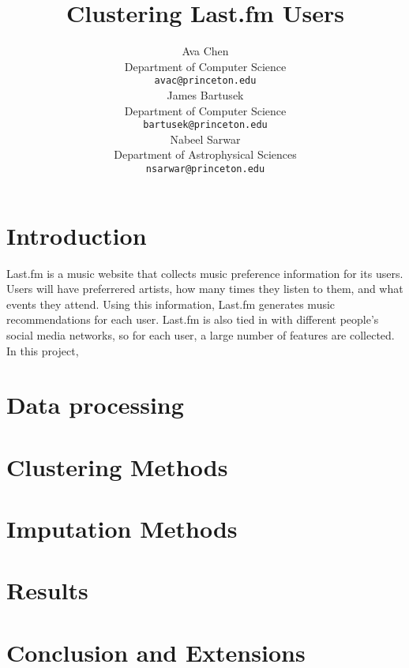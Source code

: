 \documentclass{article} %
\title{Clustering Last.fm Users}
\author{
Ava Chen\\
Department of Computer Science\\
\texttt{avac@princeton.edu}\\
\And
James Bartusek\\
Department of Computer Science\\
\texttt{bartusek@princeton.edu} \\
\And
Nabeel Sarwar\\
Department of Astrophysical Sciences\\
\texttt{nsarwar@princeton.edu} \\
}
\begin{document}
\maketitle

\begin{abstract}
\end{abstract}


\section{Introduction}

Last.fm is a music website that collects music preference information for its users. Users will have preferrered artists, how many times they listen to them, and what events they attend. Using this information, Last.fm generates music recommendations for each user. Last.fm is also tied in with different people's social media networks, so for each user, a large number of features are collected. In this project, 


\section{Data processing}



\section{Clustering Methods}

\section{Imputation Methods}
\section{Results}

\section{Conclusion and Extensions}



\end{document}
